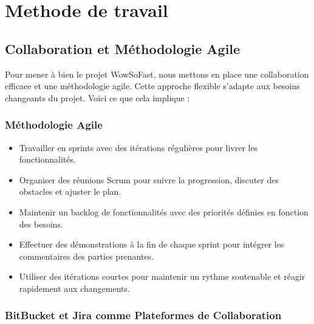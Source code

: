 \chapter{Methode de travail}
\section{Collaboration et Méthodologie Agile}

Pour mener à bien le projet WowSoFast, nous mettons en place une collaboration efficace et une méthodologie agile. Cette approche flexible s'adapte aux besoins changeants du projet. Voici ce que cela implique :

\subsection{Méthodologie Agile}

\begin{itemize}
  \item Travailler en sprints avec des itérations régulières pour livrer les fonctionnalités.
  \item Organiser des réunions Scrum pour suivre la progression, discuter des obstacles et ajuster le plan.
  \item Maintenir un backlog de fonctionnalités avec des priorités définies en fonction des besoins.
  \item Effectuer des démonstrations à la fin de chaque sprint pour intégrer les commentaires des parties prenantes.
  \item Utiliser des itérations courtes pour maintenir un rythme soutenable et réagir rapidement aux changements.
\end{itemize}

\subsection{BitBucket et Jira comme Plateformes de Collaboration}

